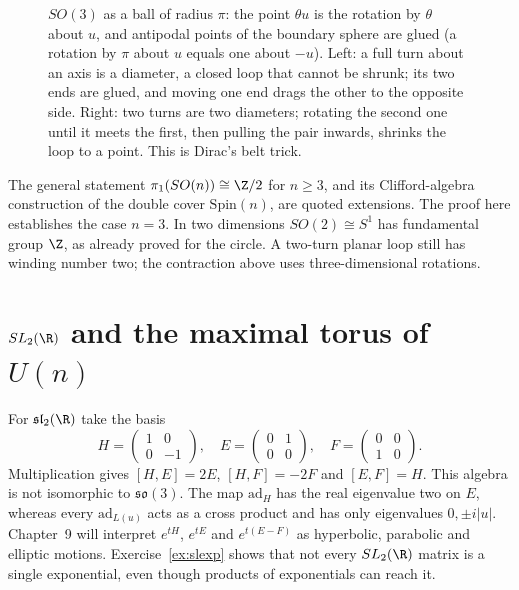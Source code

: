 \begin{figure}[ht]
\centering
{}
\caption{$SO(3)$ as a ball of radius $\pi$: the point $\theta u$ is the rotation by $\theta$ about $u$, and antipodal points of the boundary sphere are glued (a rotation by $\pi$ about $u$ equals one about
$-u$). Left: a full turn about an axis is a diameter, a closed loop that cannot be shrunk; its two ends are glued, and moving one end drags the other to the opposite side. Right: two turns are two
diameters; rotating the second one until it meets the first, then pulling the pair inwards, shrinks the loop to a point. This is Dirac's belt trick.}
\label{fig:ballmodel}
\end{figure}

\begin{remark}
The general statement $\pi_1(SO(n))\cong\Z/2$ for $n\ge3$, and its
Clifford-algebra construction of the double cover $\mathrm{Spin}(n)$,
are quoted extensions. The proof here establishes the case $n=3$.
In two dimensions $SO(2)\cong S^1$ has fundamental group $\Z$,
as already proved for the circle. A two-turn planar loop still has
winding number two; the contraction above uses three-dimensional rotations.
\end{remark}

\section{$SL_2(\R)$ and the maximal torus of $U(n)$}

For $\mathfrak{sl}_2(\R)$ take the basis
\[
 H=\begin{pmatrix}1&0\\0&-1\end{pmatrix},\quad
 E=\begin{pmatrix}0&1\\0&0\end{pmatrix},\quad
 F=\begin{pmatrix}0&0\\1&0\end{pmatrix}.
\]
Multiplication gives $[H,E]=2E$, $[H,F]=-2F$ and $[E,F]=H$.
This algebra is not isomorphic to $\mathfrak{so}(3)$.
The map $\mathrm{ad}_H$ has the real eigenvalue two on $E$,
whereas every $\mathrm{ad}_{L(u)}$ acts as a cross product and has
only eigenvalues $0,\pm i|u|$.
Chapter~9 will interpret $e^{tH}$, $e^{tE}$ and $e^{t(E-F)}$ as
hyperbolic, parabolic and elliptic motions.
Exercise~\ref{ex:slexp} shows that not every $SL_2(\R)$ matrix is a
single exponential, even though products of exponentials can reach it.

